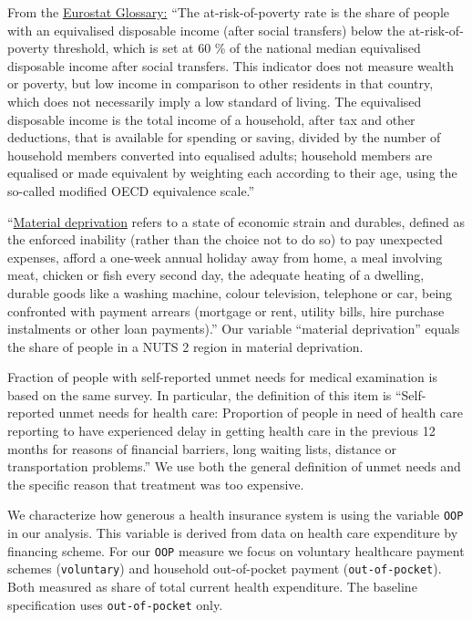 \documentclass[a4paper,12pt]{article}
\begin{document}
From the \href{https://ec.europa.eu/eurostat/statistics-explained/index.php?title=Glossary:At-risk-of-poverty\_rate}{Eurostat Glossary:} ``The at-risk-of-poverty rate is the share of people with an equivalised disposable income (after social transfers) below the at-risk-of-poverty threshold, which is set at 60 \% of the national median equivalised disposable income after social transfers. This indicator does not measure wealth or poverty, but low income in comparison to other residents in that country, which does not necessarily imply a low standard of living. The equivalised disposable income is the total income of a household, after tax and other deductions, that is available for spending or saving, divided by the number of household members converted into equalised adults; household members are equalised or made equivalent by weighting each according to their age, using the so-called modified OECD equivalence scale.''

``\href{https://ec.europa.eu/eurostat/statistics-explained/index.php?title=Glossary:Material\_deprivation}{Material deprivation} refers to a state of economic strain and durables, defined as the enforced inability (rather than the choice not to do so) to pay unexpected expenses, afford a one-week annual holiday away from home, a meal involving meat, chicken or fish every second day, the adequate heating of a dwelling, durable goods like a washing machine, colour television, telephone or car, being confronted with payment arrears (mortgage or rent, utility bills, hire purchase instalments or other loan payments).'' Our variable ``material deprivation'' equals the share of people in a NUTS 2 region in material deprivation.

Fraction of people with self-reported unmet needs for medical examination is based on the same survey. In particular, the definition of this item is ``Self-reported unmet needs for health care: Proportion of people in need of health care reporting to have experienced delay in getting health care in the previous 12 months for reasons of financial barriers, long waiting lists, distance or transportation problems.'' We use both the general definition of unmet needs and the specific reason that treatment was too expensive.

We characterize how generous a health insurance system is using the variable \texttt{OOP} in our analysis. This variable is derived from data on health care expenditure by financing scheme. For our \texttt{OOP} measure we focus on voluntary healthcare payment schemes (\texttt{voluntary}) and household out-of-pocket payment (\texttt{out-of-pocket}). Both measured as share of total current health expenditure. The baseline specification uses \texttt{out-of-pocket} only.
\end{document}
